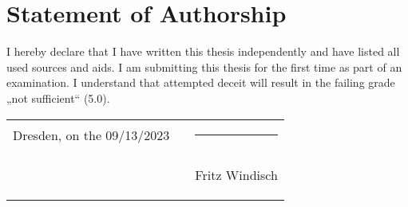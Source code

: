 

\chapter*{Statement of Authorship}

I hereby declare that I have written this thesis independently and have listed all used
sources and aids. I am submitting this thesis for the first time as part of an examination. I
understand that attempted deceit will result in the failing grade „not sufficient“ (5.0).\\[4ex]

\renewcommand{\arraystretch}{0}
\begin{table}[h]
    \begin{tabularx}{\textwidth}{ llX }
        Dresden, on the 09/13/2023 & \hspace{40pt} & \hrule \\
        & & \begin{flushright} Fritz Windisch \end{flushright} \\
    \end{tabularx}
\end{table}
\renewcommand{\arraystretch}{1}